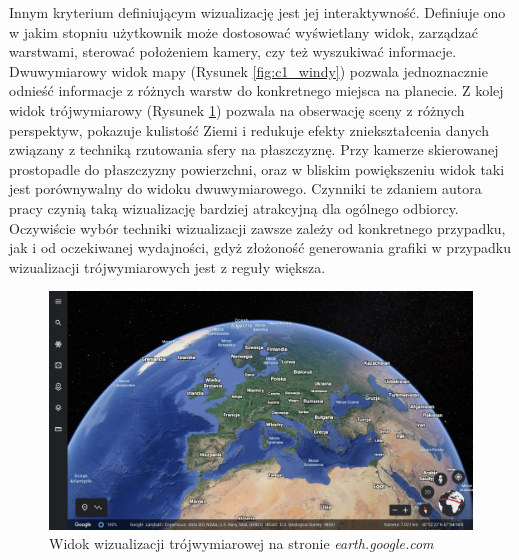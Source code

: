Innym kryterium definiującym wizualizację jest jej interaktywność. Definiuje ono w jakim stopniu użytkownik może dostosować wyświetlany widok, zarządzać warstwami, sterować położeniem kamery, czy też wyszukiwać informacje. Dwuwymiarowy widok mapy (Rysunek \ref{fig:c1_windy}) pozwala jednoznacznie odnieść informacje z różnych warstw do konkretnego miejsca na planecie. Z kolej widok trójwymiarowy (Rysunek \ref{fig:c1_google_earth}) pozwala na obserwację sceny z różnych perspektyw, pokazuje kulistość Ziemi i redukuje efekty zniekształcenia danych związany z techniką rzutowania sfery na płaszczyznę. Przy kamerze skierowanej prostopadle do płaszczyzny powierzchni, oraz w bliskim powiększeniu widok taki jest porównywalny do widoku dwuwymiarowego. Czynniki te zdaniem autora pracy czynią taką wizualizację bardziej atrakcyjną dla ogólnego odbiorcy. Oczywiście wybór techniki wizualizacji zawsze zależy od konkretnego przypadku, jak i od oczekiwanej wydajności, gdyż złożoność generowania grafiki w przypadku wizualizacji trójwymiarowych jest z reguły większa.


\begin{figure}[h]
    \centering
    \includegraphics[width=\linewidth]{img/c1_google_earth.png}
    \caption{Widok wizualizacji trójwymiarowej na stronie \textit{earth.google.com}}
    \label{fig:c1_google_earth}
\end{figure}